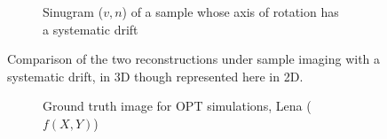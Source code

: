 \begin{figure}
\begin{subfigure}[t]{0.3\textwidth}
    \caption{Sinugram (\(v,n\)) of a sample whose axis of rotation has a systematic drift}\label{fig:flopt_helix_sinugram}
  \end{subfigure}
   \hspace*{\fill}
   \caption{Comparison of the two reconstructions under sample imaging with a systematic drift, in 3D though represented here in 2D.}\label{fig:flopts}
\end{figure}

\begin{figure}
  \centering
   \hspace*{\fill}
  \begin{subfigure}[t]{0.3\textwidth}
    \caption{Ground truth image for \gls{OPT} simulations, Lena (\(f(X, Y)\))}\label{fig:raw_input}
  \end{subfigure}\hfill
  \begin{subfigure}[t]{0.3\textwidth}
    \begin{tikzpicture}[node distance=0cm]

\end{tikzpicture}
\end{subfigure}
\end{figure}
